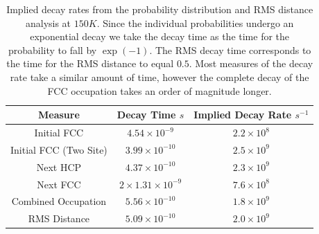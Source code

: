 \begin{table}[htbp]
    \begin{center}
        \begin{tabular}{ *{3}{c} }
            \toprule
            Measure                & Decay Time \(s\)                  & Implied Decay Rate \(s^{-1}\) \\
            \midrule
            Initial FCC            & \(4.54\times{}10^{-9}\)           & \(2.2\times{}10^{8}\)         \\
            Initial FCC (Two Site) & \(3.99\times{}10^{-10}\)          & \(2.5\times{}10^{9}\)         \\
            Next HCP               & \(4.37\times{}10^{-10}\)          & \(2.3\times{}10^{9}\)         \\
            Next FCC               & \(2\times{}1.31 \times{}10^{-9}\) & \(7.6\times{}10^{8}\)         \\
            Combined Occupation    & \(5.56\times{}10^{-10}\)          & \(1.8\times{}10^{9}\)         \\
            RMS Distance           & \(5.09\times{}10^{-10}\)          & \(2.0 \times 10^{9}\)         \\
            \bottomrule
        \end{tabular}
    \end{center}
    \caption{Implied decay rates
        from the probability
        distribution and RMS distance
        analysis at
        \(150K\).
        Since the individual
        probabilities undergo an exponential
        decay we take the decay time as
        the time for the probability to fall
        by \(\exp{(-1)}\).
        The RMS decay time corresponds
        to the time for the RMS distance
        to equal \(0.5\). Most measures
        of the decay rate take a similar
        amount of time, however the
        complete decay of the FCC
        occupation takes an order of
        magnitude longer.
    }\label{tab:implied decay rates}
\end{table}

